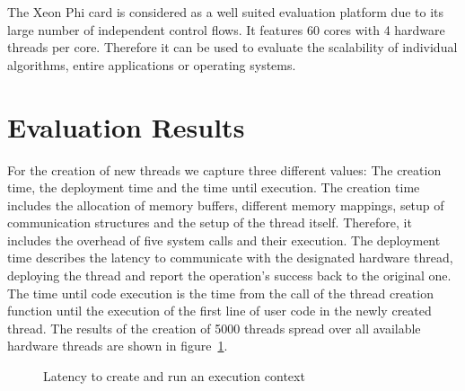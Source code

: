 The Xeon Phi card is considered as a well suited evaluation platform due to its
large number of independent control flows. It features 60 cores with 4 hardware
threads per core. Therefore it can be used to evaluate the scalability of
individual algorithms, entire applications or operating systems.

\section{Evaluation Results}
\label{sec:evaluation}

For the creation of new threads we capture three different values: The creation
time, the deployment time and the time until execution. The creation time
includes the allocation of memory buffers, different memory mappings, setup of
communication structures and the setup of the thread itself. Therefore, it
includes the overhead of five system calls and their execution. The deployment
time describes the latency to communicate with the designated hardware thread,
deploying the thread and report the operation's success back to the original
one. The time until code execution is the time from the call of the thread
creation function until the execution of the first line of user code in the
newly created thread. The results of the creation of \num{5000} threads spread
over all available hardware threads are shown in figure~\ref{fig:EC-creation}.

\begin{figure}[ht!]
  \begin{center}
    \caption{Latency to create and run an execution context}
    \label{fig:EC-creation}
  \end{center}
\end{figure}

